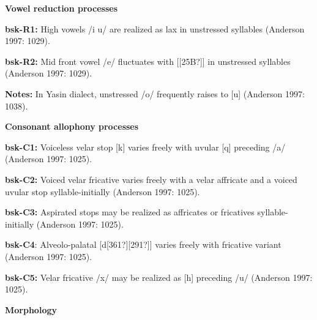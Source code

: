 \begin{styleBody}
\textbf{Vowel reduction processes}
\end{styleBody}

\begin{styleBody}
\textbf{bsk-R1:} High vowels /i u/ are realized as lax in unstressed syllables (Anderson 1997: 1029).
\end{styleBody}

\begin{styleBody}
\textbf{bsk-R2: }Mid front vowel /e/ fluctuates with [[25B?]] in unstressed syllables (Anderson 1997: 1029).
\end{styleBody}

\begin{styleBody}
\textbf{Notes: }In Yasin dialect, unstressed /o/ frequently raises to [u] (Anderson 1997: 1038).
\end{styleBody}

\begin{styleBody}
\textbf{Consonant allophony processes}
\end{styleBody}

\begin{styleBody}
\textbf{bsk-C1: }Voiceless velar stop [k] varies freely with uvular [q] preceding /a/ (Anderson 1997: 1025).
\end{styleBody}

\begin{styleBody}
\textbf{bsk-C2: }Voiced velar fricative varies freely with a velar affricate and a voiced uvular stop syllable-initially (Anderson 1997: 1025).
\end{styleBody}

\begin{styleBody}
\textbf{bsk-C3: }Aspirated stops may be realized as affricates or fricatives syllable-initially (Anderson 1997: 1025).
\end{styleBody}

\begin{styleBody}
\textbf{bsk-C4}: Alveolo-palatal [d[361?][291?]] varies freely with fricative variant (Anderson 1997: 1025).
\end{styleBody}

\begin{styleBody}
\textbf{bsk-C5: }Velar fricative /x/ may be realized as [h] preceding /u/ (Anderson 1997: 1025).
\end{styleBody}

\begin{styleBody}
\textbf{Morphology}
\end{styleBody}

